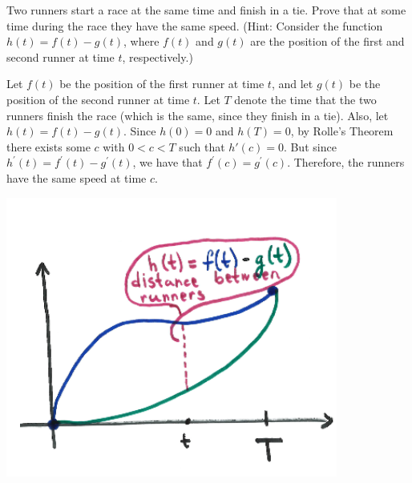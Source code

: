 \documentclass[nooutcomes,handout]{ximera}
\begin{document}
\begin{problem}
  Two runners start a race at the same time and finish in a tie.
  Prove that at some time during the race they have the same speed.
  (Hint:  Consider the function $h(t)=f(t)-g(t)$, where $f(t)$ and $g(t)$ are the position of the first and second runner at time $t$, respectively.)
  \begin{freeResponse}
    Let $f(t)$ be the position of the first runner at time $t$, and let $g(t)$ be the position of the second runner at time $t$.
    Let $T$ denote the time that the two runners finish the race (which is the same, since they finish in a tie).
    Also, let $h(t) = f(t) - g(t)$.
    Since $h(0) = 0$ and $h(T) = 0$, by Rolle's Theorem there exists some $c$ with $0 < c < T$ such that $h'(c)=0$.
    But since $h^\prime (t) = f^\prime (t) - g^\prime (t)$, we have that $f^\prime (c) = g^\prime (c)$.
    Therefore, the runners have the same speed at time $c$.  

    \begin{image}
      \includegraphics[scale=.45]{Images/Figure6.png}
    \end{image}
  \end{freeResponse}
\end{problem}
\end{document}
